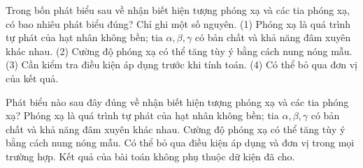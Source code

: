 \begin{ex}
Trong bốn phát biểu sau về nhận biết hiện tượng phóng xạ và các tia phóng xạ, có bao nhiêu phát biểu đúng? Chỉ ghi một số nguyên. (1) Phóng xạ là quá trình tự phát của hạt nhân không bền; tia $\alpha,\beta,\gamma$ có bản chất và khả năng đâm xuyên khác nhau. (2) Cường độ phóng xạ có thể tăng tùy ý bằng cách nung nóng mẫu. (3) Cần kiểm tra điều kiện áp dụng trước khi tính toán. (4) Có thể bỏ qua đơn vị của kết quả.
\end{ex}

\begin{ex}
Phát biểu nào sau đây đúng về nhận biết hiện tượng phóng xạ và các tia phóng xạ?
\choice
{\True Phóng xạ là quá trình tự phát của hạt nhân không bền; tia $\alpha,\beta,\gamma$ có bản chất và khả năng đâm xuyên khác nhau.}
{Cường độ phóng xạ có thể tăng tùy ý bằng cách nung nóng mẫu.}
{Có thể bỏ qua điều kiện áp dụng và đơn vị trong mọi trường hợp.}
{Kết quả của bài toán không phụ thuộc dữ kiện đã cho.}
\end{ex}

